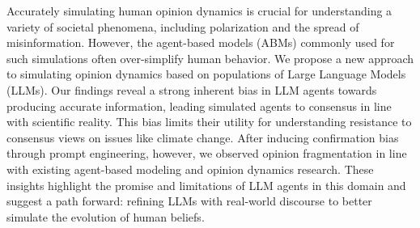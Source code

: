Accurately simulating human opinion dynamics is crucial for understanding a variety of societal phenomena, including polarization and the spread of misinformation. However, the agent-based models (ABMs) commonly used for such simulations often over-simplify human behavior. We propose a new approach to simulating opinion dynamics based on populations of Large Language Models (LLMs). Our findings reveal a strong inherent bias in LLM agents towards producing accurate information, leading simulated agents to consensus in line with scientific reality. This bias limits their utility for understanding resistance to consensus views on issues like climate change. After inducing confirmation bias through prompt engineering, however, we observed opinion fragmentation in line with existing agent-based modeling and opinion dynamics research. These insights highlight the promise and limitations of LLM agents in this domain and suggest a path forward: refining LLMs with real-world discourse to better simulate the evolution of human beliefs.